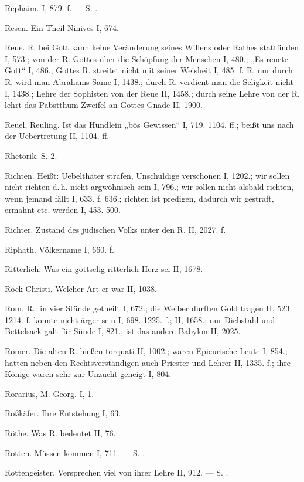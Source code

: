 Rephaim. I, 879. f. — S. .

Resen. Ein Theil Ninives I, 674.

Reue. R.  bei Gott kann keine Veränderung seines Willens oder Rathes stattfinden I, 573.; von der R. Gottes über die Schöpfung der Menschen I, 480.; „Es reuete Gott“ I, 486.; Gottes R. streitet nicht mit seiner Weisheit I, 485. f. R.  nur durch R. wird man Abrahams Same I, 1438.; durch R. verdient man die Seligkeit nicht I, 1438.; Lehre der Sophisten von der Reue II, 1458.; durch seine Lehre von der R. lehrt das Pabstthum Zweifel an Gottes Gnade II, 1900.

Reuel, Reuling. Ist das Hündlein „bös Gewissen“ I, 719. 1104. ff.; beißt uns nach der Uebertretung II, 1104. ff.

Rhetorik. S.  2.

Richten. Heißt: Uebelthäter strafen, Unschuldige verschonen I, 1202.; wir sollen nicht richten d.\,h. nicht argwöhnisch sein I, 796.; wir sollen nicht alsbald richten, wenn jemand fällt I, 633. f. 636.; richten ist predigen, dadurch wir gestraft, ermahnt etc. werden I, 453. 500.

Richter. Zustand des jüdischen Volks unter den R. II, 2027. f.

Riphath. Völkername I, 660. f.

Ritterlich. Was ein gottselig ritterlich Herz sei II, 1678.

Rock Christi. Welcher Art er war II, 1038.

Rom.  R.: in vier Stände getheilt I, 672.; die Weiber durften Gold tragen II, 523. 1214. f.  konnte nicht ärger sein I, 698. 1225. f.; II, 1658.; nur Diebstahl und Bettelsack galt für Sünde I, 821.; ist das andere Babylon II, 2025.

Römer. Die alten R. hießen torquati II, 1002.; waren Epicurische Leute I, 854.; hatten neben den Rechtsverständigen auch Priester und Lehrer II, 1335. f.; ihre Könige waren sehr zur Unzucht geneigt I, 804.

Rorarius, M. Georg. I, 1.

Roßkäfer. Ihre Entstehung I, 63.

Röthe. Was R. bedeutet II, 76.

Rotten. Müssen kommen I, 711. — S. .

Rottengeister. Versprechen viel von ihrer Lehre II, 912. — S. .

